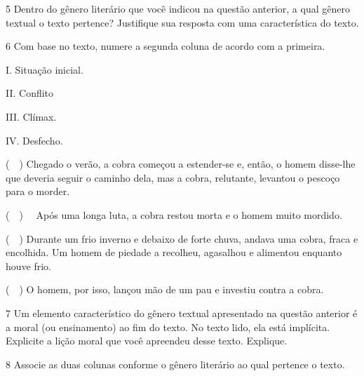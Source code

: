 
\num{5} Dentro do gênero literário que você indicou na questão anterior,
a qual gênero textual o texto pertence? Justifique sua resposta com uma
característica do texto.


\num{6} Com base no texto, numere a segunda coluna de acordo com a
primeira.

\begin{multicols}{2}

I. Situação inicial.

II. Conflito

III. Clímax. 

IV. Desfecho.
\columnbreak

(~~) Chegado o verão, a cobra começou a
estender-se e, então, o homem disse-lhe que deveria seguir o caminho
dela, mas a cobra, relutante, levantou o pescoço para o morder.

(~~) ~~Após uma longa luta, a cobra restou morta e
o homem muito mordido.

(~~) Durante um frio
inverno e debaixo de forte chuva, andava uma cobra, fraca e encolhida.
Um homem de piedade a recolheu, agasalhou e alimentou enquanto houve
frio. 

(~~) O homem, por isso, lançou mão de um
pau e investiu contra a cobra.
\end{multicols}

\num{7} Um elemento característico do gênero textual apresentado na
questão anterior é a moral (ou ensinamento) ao fim do texto. No texto
lido, ela está implícita. Explicite a lição moral que você apreendeu
desse texto. Explique.


\pagebreak

\num{8} Associe as duas colunas conforme o gênero literário ao qual
pertence o texto.

